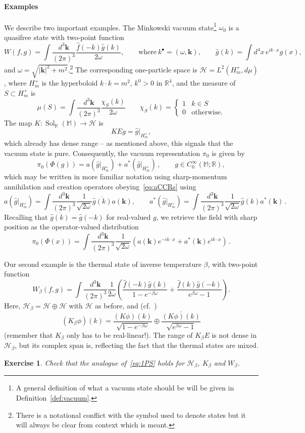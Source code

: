 \documentclass[12pt]{article}
\newcommand{\1}{\mathds{1}}                         %
\newcommand{\RR}{\mathbb{R}}           %
\newcommand{\MM}{\mathbb{M}}
\newcommand{\HH}{{\mathcal{H}}}
\newcommand{\kb}{{\boldsymbol{k}}}
\newcommand{\CoinX}[1]{C_0^\infty(#1)}
\newtheorem{exercise}[theorem]{Exercise}
\DeclareMathOperator{\Sol}{Sol}
\begin{document}
\paragraph{Examples} We describe two important examples. The Minkowski vacuum state\footnote{A general definition of what a vacuum state should be will be given in Definition~\ref{def:vacuum}.} $\omega_0$ is a quasifree state with two-point function 
\[
W(f,g) = \int\frac{d^3\kb}{(2\pi)^3} \frac{\hat{f}(-k) \hat{g}(k)}{2\omega}, \qquad \text{where}~k^\bullet =(\omega,\kb),
\qquad \hat{g}(k) = \int d^4x\, e^{ik\cdot x}g(x),
\]
and $\omega=\sqrt{|\boldsymbol{k}|^2+m^2}$.\footnote{There is a notational conflict with the symbol used to denote states but it will always be clear from context which is meant.} The corresponding
one-particle space is $\HH=L^2(H^+_{m},d\mu)$, where
$H^+_m$ is the hyperboloid $k\cdot k=m^2$, $k^0>0$ in $\RR^4$,
and the measure of $S\subset H^+_m$ is
\[
\mu(S) = \int \frac{d^3\kb}{(2\pi)^3} \frac{\chi_S(k)}{2\omega}\qquad \chi_S(k)=\begin{cases} 1 & k\in S\\ 0 & \text{otherwise.}\end{cases}
\]
The map $K:\Sol_\RR(\MM)\to\HH$ is 
\[
KEg = \hat{g}|_{H^+_m},
\]
which already has dense range -- as mentioned above, this signals that the vacuum state is pure. Consequently, the vacuum representation $\pi_0$ is given by
\[
\pi_0(\Phi(g))=a(\hat{g}|_{H^+_m})+a^*(\hat{g}|_{H^+_m})\,, \qquad g\in\CoinX{\MM;\RR},
\]
which may be written in more familiar notation using sharp-momentum annihilation and creation operators obeying~\eqref{eq:aCCRs} using
\[
a(\hat{g}|_{H^+_m})=\int\frac{d^3\boldsymbol{k}}{(2\pi)^3}\frac{1}{\sqrt{2\omega}} \overline{\hat{g}(k)} a(\boldsymbol{k}),\qquad a^*(\hat{g}|_{H^+_m})=\int\frac{d^3\boldsymbol{k}}{(2\pi)^3}\frac{1}{\sqrt{2\omega}} \hat{g}(k) a^*(\boldsymbol{k})\,.
\]
Recalling that $\overline{\hat{g}(k)}=\hat{g}(-k)$ for real-valued $g$, we retrieve the field with sharp position as the operator-valued distribution
\[
\pi_0(\Phi(x))=\int \frac{d^3\boldsymbol{k}}{(2\pi)^3}\frac{1}{\sqrt{2\omega}}\left(a(\boldsymbol{k})e^{-ik\cdot x}+a^*(\boldsymbol{k})e^{ik\cdot x}
\right)\,.
\]

Our second example is the thermal state of inverse temperature $\beta$, with two-point function
\[
W_\beta(f,g) = \int\frac{d^3\kb}{(2\pi)^3}\frac{1}{2\omega} \left(\frac{\hat{f}(-k) \hat{g}(k)}{1-e^{-\beta \omega}} +
\frac{\hat{f}(k) \hat{g}(-k)}{e^{\beta \omega}-1}\right).
\]
Here, $\HH_\beta=\HH\oplus\HH$ with $\HH$ as before, and (cf.~\cite{Kay:1985a})
\[
(K_\beta \phi)(k) = \frac{(K\phi)(k)}{\sqrt{1-e^{-\beta\omega}}} \oplus  \frac{\overline{(K\phi)(k)}}{\sqrt{e^{\beta\omega}-1}} 
\]
(remember that $K_\beta$ only has to be real-linear!). The range of $K_\beta E$ is not dense in $\HH_\beta$, but its complex span is, reflecting the fact that the thermal states are mixed.
\begin{exercise}
	Check that the analogue of~\eqref{eq:1PS} holds for $\HH_\beta$, $K_\beta$ and $W_\beta$.
\end{exercise}
\end{document}
